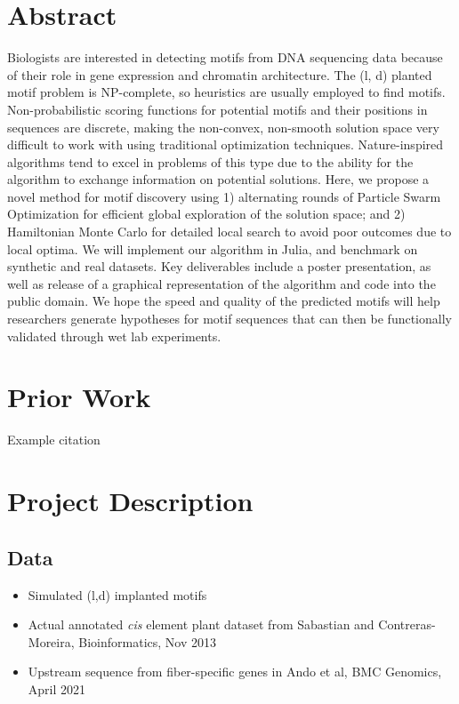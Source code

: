 \documentclass{article}
\begin{document}
\section{Abstract}
Biologists are interested in detecting motifs from DNA sequencing data because of their role in gene expression and chromatin architecture.
The (l, d) planted motif problem is NP-complete, so heuristics are usually employed to find motifs. Non-probabilistic scoring functions for potential motifs and their positions in sequences are discrete, making the non-convex, non-smooth solution space very difficult to work with using traditional optimization techniques. Nature-inspired algorithms tend to excel in problems of this type due to the ability for the algorithm to exchange information on potential solutions. Here, we propose a novel method for motif discovery using 1) alternating rounds of Particle Swarm Optimization for efficient global exploration of the solution space; and 2) Hamiltonian Monte Carlo for detailed local search to avoid poor outcomes due to local optima. We will implement our algorithm in Julia, and benchmark on synthetic and real datasets. Key deliverables include a poster presentation, as well as release of a graphical representation of the algorithm and code into the public domain. We hope the speed and quality of the predicted motifs will help researchers generate hypotheses for motif sequences that can then be functionally validated through wet lab experiments.
\section{Prior Work}
Example citation \cite{fister2013brief}
\section{Project Description}

\subsection{Data}
\begin{itemize}
	\item Simulated (l,d) implanted motifs
	\item Actual annotated \textit{cis} element plant dataset from Sabastian and Contreras-Moreira, Bioinformatics, Nov 2013
	\item Upstream sequence from fiber-specific genes in Ando et al, BMC Genomics, April 2021
\end{itemize}
\end{document}
